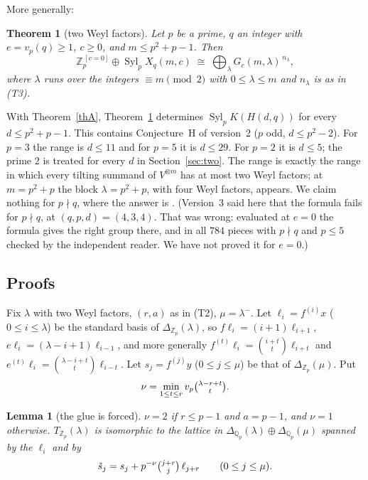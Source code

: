\documentclass[10pt]{article}
\theoremstyle{ds}
\newtheorem{theorem}{Theorem}
\newtheorem{lemma}{Lemma}
\theoremstyle{dsrem}
\newcommand{\Z}{\mathbb{Z}}
\newcommand{\Q}{\mathbb{Q}}
\newcommand{\Syl}{\operatorname{Syl}}
\begin{document}
More generally:

\begin{theorem}[two Weyl factors]\label{thG}
Let $p$ be a prime, $q$ an integer with $e=v_p(q)\ge1$, $c\ge0$, and $m\le p^2+p-1$. Then
\[
\Z_p^{\,[c=0]}\oplus\Syl_pX_q(m,c)\;\cong\;\bigoplus_{\lambda}G_c(m,\lambda)^{\,n_\lambda},
\]
where $\lambda$ runs over the integers $\equiv m\pmod 2$ with $0\le\lambda\le m$ and $n_\lambda$ is as in (T3).
\end{theorem}

With Theorem~\ref{thA}, Theorem~\ref{thG} determines $\Syl_pK(H(d,q))$ for every $d\le p^2+p-1$. This contains Conjecture~H of version~2 ($p$ odd, $d\le p^2-2$). For $p=3$ the range is $d\le11$ and for $p=5$ it is $d\le29$. For $p=2$ it is $d\le5$; the prime $2$ is treated for every $d$ in Section~\ref{sec:two}. The range is exactly the range in which every tilting summand of $V^{\otimes m}$ has at most two Weyl factors; at $m=p^2+p$ the block $\lambda=p^2+p$, with four Weyl factors, appears. We claim nothing for $p\nmid q$, where the answer is \cite[Theorem~2]{JNR}. (Version~3 said here that the formula fails for $p\nmid q$, at $(q,p,d)=(4,3,4)$. That was wrong: evaluated at $e=0$ the formula gives the right group there, and in all $784$ pieces with $p\nmid q$ and $p\le5$ checked by the independent reader. We have not proved it for $e=0$.)

\subsection{Proofs}
Fix $\lambda$ with two Weyl factors, $(r,a)$ as in (T2), $\mu=\lambda^-$. Let $\ell_i=f^{(i)}x$ ($0\le i\le\lambda$) be the standard basis of $\Delta_{\Z_p}(\lambda)$, so $f\ell_i=(i+1)\ell_{i+1}$, $e\ell_i=(\lambda-i+1)\ell_{i-1}$, and more generally $f^{(t)}\ell_i=\binom{i+t}{t}\ell_{i+t}$ and $e^{(t)}\ell_i=\binom{\lambda-i+t}{t}\ell_{i-t}$. Let $s_j=f^{(j)}y$ ($0\le j\le\mu$) be that of $\Delta_{\Z_p}(\mu)$. Put
\[
\nu=\min_{1\le t\le r}v_p\tbinom{\lambda-r+t}{t}.
\]

\begin{lemma}[the glue is forced]\label{forced}
$\nu=2$ if $r\le p-1$ and $a=p-1$, and $\nu=1$ otherwise. $T_{\Z_p}(\lambda)$ is isomorphic to the lattice in $\Delta_{\Q_p}(\lambda)\oplus\Delta_{\Q_p}(\mu)$ spanned by the $\ell_i$ and by
\[
\tilde s_j=s_j+p^{-\nu}\tbinom{j+r}{j}\,\ell_{j+r}\qquad(0\le j\le\mu).
\]
\end{lemma}
\end{document}
